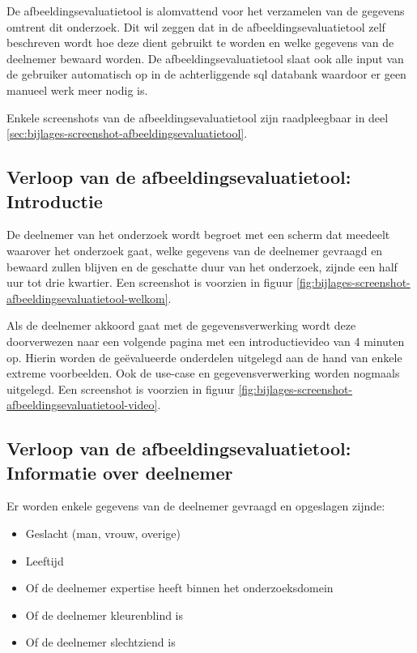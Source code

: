 De \gls{afbeeldingsevaluatietool} is alomvattend voor het verzamelen van de gegevens omtrent dit onderzoek. Dit wil zeggen dat in de \gls{afbeeldingsevaluatietool} zelf beschreven wordt hoe deze dient gebruikt te worden en welke gegevens van de deelnemer bewaard worden. De \gls{afbeeldingsevaluatietool} slaat ook alle input van de gebruiker automatisch op in de achterliggende \gls{sql} databank waardoor er geen manueel werk meer nodig is.

Enkele screenshots van de \gls{afbeeldingsevaluatietool} zijn raadpleegbaar in deel \ref{sec:bijlages-screenshot-afbeeldingsevaluatietool}.

\subsection{Verloop  van de afbeeldingsevaluatietool: Introductie}
\label{sec:onderzoek-evaluatietool-verloop-intro}

De deelnemer van het onderzoek wordt begroet met een scherm dat meedeelt waarover het onderzoek gaat, welke gegevens van de deelnemer gevraagd en bewaard zullen blijven en de geschatte duur van het onderzoek, zijnde een half uur tot drie kwartier. Een screenshot is voorzien in figuur \ref{fig:bijlages-screenshot-afbeeldingsevaluatietool-welkom}.

Als de deelnemer akkoord gaat met de gegevensverwerking wordt deze doorverwezen naar een volgende pagina met een introductievideo van 4 minuten op. Hierin worden de geëvalueerde onderdelen uitgelegd aan de hand van enkele extreme voorbeelden. Ook de \gls{use-case} en gegevensverwerking worden nogmaals uitgelegd. Een screenshot is voorzien in figuur \ref{fig:bijlages-screenshot-afbeeldingsevaluatietool-video}.

\subsection{Verloop  van de afbeeldingsevaluatietool: Informatie over deelnemer}
\label{sec:onderzoek-evaluatietool-verloop-info-participant}

Er worden enkele gegevens van de deelnemer gevraagd en opgeslagen zijnde: 

\begin{itemize}
	\item Geslacht (man, vrouw, overige)
	\item Leeftijd
	\item Of de deelnemer expertise heeft binnen het 
	onderzoeksdomein
	\item Of de deelnemer kleurenblind is
	\item Of de deelnemer slechtziend is
\end{itemize}


